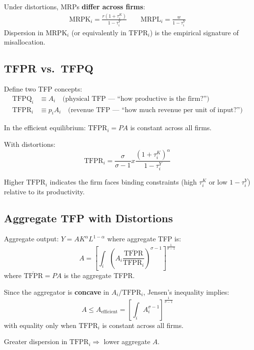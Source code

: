 \documentclass[a4paper,11pt]{article}
\newcommand{\MRPK}{\mathrm{MRPK}}
\newcommand{\MRPL}{\mathrm{MRPL}}
\newcommand{\TFPR}{\mathrm{TFPR}}
\newcommand{\TFPQ}{\mathrm{TFPQ}}
\begin{document}
\begin{resultbox}
Under distortions, MRPs \textbf{differ across firms}:
\begin{align*}
\boxed{\MRPK_i = \frac{r(1+\tau_i^K)}{1-\tau_i^Y}} \qquad \boxed{\MRPL_i = \frac{w}{1-\tau_i^Y}}
\tag{Distorted MRPs}
\end{align*}
Dispersion in $\MRPK_i$ (or equivalently in $\TFPR_i$) is the empirical signature of misallocation.
\end{resultbox}

\subsection*{TFPR vs.\ TFPQ}

Define two TFP concepts:
\begin{align*}
\TFPQ_i &\equiv A_i \quad \text{(physical TFP --- ``how productive is the firm?'')} \\
\TFPR_i &\equiv p_i A_i \quad \text{(revenue TFP --- ``how much revenue per unit of input?'')}
\end{align*}

In the efficient equilibrium: $\TFPR_i = PA$ is constant across all firms.

With distortions:
\[
\TFPR_i = \frac{\sigma}{\sigma-1} x \frac{(1+\tau_i^K)^\alpha}{1-\tau_i^Y}
\]

Higher $\TFPR_i$ indicates the firm faces binding constraints (high $\tau_i^K$ or low $1-\tau_i^Y$) relative to its productivity.

\subsection*{Aggregate TFP with Distortions}

\begin{derivationbox}[title={Derivation: Aggregate TFP Loss}]
Aggregate output: $Y = A K^\alpha L^{1-\alpha}$ where aggregate TFP is:
\[
A = \left[\int_i \left(A_i \frac{\overline{\TFPR}}{\TFPR_i}\right)^{\sigma-1}\right]^{\frac{1}{\sigma-1}}
\]
where $\overline{\TFPR} = PA$ is the aggregate TFPR.

Since the aggregator is \textbf{concave} in $A_i / \TFPR_i$, Jensen's inequality implies:
\[
A \leq A_{\text{efficient}} = \left[\int_i A_i^{\sigma-1}\right]^{\frac{1}{\sigma-1}}
\]
with equality only when $\TFPR_i$ is constant across all firms.

Greater dispersion in $\TFPR_i \Rightarrow$ lower aggregate $A$.
\end{derivationbox}
\end{document}
